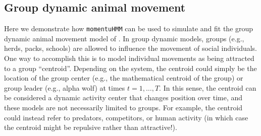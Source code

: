 \documentclass[12pt]{article}\usepackage[]{graphicx}\usepackage[]{xcolor}
\begin{document}
\subsection{Group dynamic animal movement}
\label{sec:groupModel}
Here we demonstrate how \verb|momentuHMM| can be used to simulate and fit the group dynamic animal movement model of \cite{LangrockEtAl2014}. In group dynamic models, groups (e.g., herds, packs, schools) are allowed to influence the movement of social individuals. One way to accomplish this is to model individual movements as being attracted to a group ``centroid''. Depending on the system, the centroid could simply be the location of the group center (e.g., the mathematical centroid of the group) or group leader (e.g., alpha wolf) at times $t=1,\dots,T$.  In this sense, the centroid can be considered a dynamic activity center that changes position over time, and these models are not necessarily limited to groups.  For example, the centroid could instead refer to predators, competitors, or human activity (in which case the centroid might be repulsive rather than attractive!). 
\end{document}
